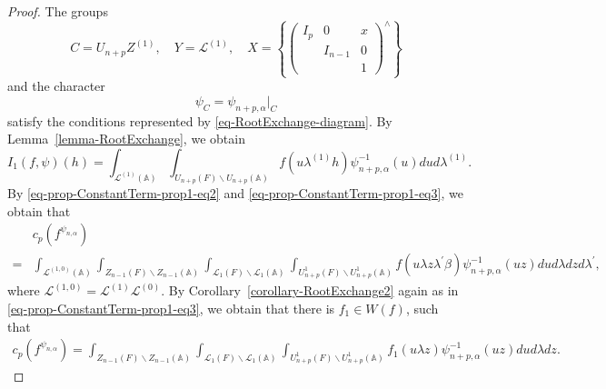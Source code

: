\documentclass[12pt]{amsart}
\newcommand{\A}{\mathbb{A}}
\theoremstyle{remark}
\begin{document}
\begin{proof}
The groups
\begin{equation*}
C=U_{n+p}Z^{(1)}, \quad Y=\mathcal{L}^{(1)}, \quad X=\left\{ \begin{pmatrix} I_p & 0 &x\\ &I_{n-1}&0\\&&1\end{pmatrix}^\wedge \right\}	
\end{equation*}
and the character 
\begin{equation*}
\psi_C=\psi_{n+p,\alpha}\Big|_{C}	
\end{equation*}
satisfy the conditions represented by \eqref{eq-RootExchange-diagram}. By Lemma~\ref{lemma-RootExchange}, we obtain
\begin{equation}
\label{eq-prop-ConstantTerm-prop1-eq5}
I_1(f,\psi)(h)=\int_{\mathcal{L}^{(1)}(\A)}  \int_{U_{n+p}(F)\backslash U_{n+p}(\A)} f( u \lambda^{(1)} h) \psi_{n+p,\alpha}^{-1}(u) du d\lambda^{(1)}.	
\end{equation}
By \eqref{eq-prop-ConstantTerm-prop1-eq2} and  \eqref{eq-prop-ConstantTerm-prop1-eq3}, we obtain that
\begin{equation}
\label{eq-prop-ConstantTerm-prop1-eq6}
\begin{split}
&c_p(f^{\psi_{n,\alpha}})\\
=&\int_{\mathcal{L}^{(1,0)}(\A)} \int_{Z_{n-1}(F)\backslash Z_{n-1}(\A)} \int_{\mathcal{L}_1(F)\backslash \mathcal{L}_1(\A)} \int_{U_{n+p}^1(F)\backslash U_{n+p}^1(\A)} f( u \lambda z \lambda^\prime \beta) \psi_{n+p,\alpha}^{-1}(uz) dud\lambda dz d\lambda^\prime,	
\end{split}
\end{equation}
where $\mathcal{L}^{(1,0)}=\mathcal{L}^{(1)} \mathcal{L}^{(0)}$. By Corollary~\ref{corollary-RootExchange2} again as in \eqref{eq-prop-ConstantTerm-prop1-eq3}, we obtain that there is $f_1\in W(f)$, such that
\begin{equation}
\label{eq-prop-ConstantTerm-prop1-eq7}
\begin{split}
c_p(f^{\psi_{n,\alpha}})= \int_{Z_{n-1}(F)\backslash Z_{n-1}(\A)} \int_{\mathcal{L}_1(F)\backslash \mathcal{L}_1(\A)} \int_{U_{n+p}^1(F)\backslash U_{n+p}^1(\A)} f_1( u \lambda z  ) \psi_{n+p,\alpha}^{-1}(uz) dud\lambda dz .	
\end{split}
\end{equation}


\end{proof}
\end{document}
